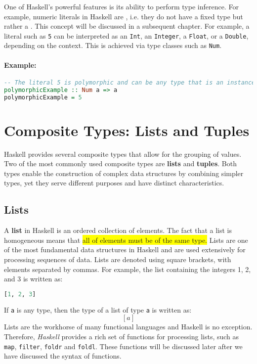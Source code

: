 \noindent
One of Haskell’s powerful features is its ability to perform type inference. For example, numeric literals in
Haskell are , i.e. they do not have a fixed type but rather a .  This
concept will be discussed in a subsequent chapter.  For example, a literal such as \texttt{5} can be
interpreted as an \texttt{Int}, an \texttt{Integer}, a \texttt{Float}, or a \texttt{Double}, depending on the
context. This is achieved via type classes such as \texttt{Num}. 

\paragraph{Example:}
\begin{lstlisting}[style=haskellstyle, language=Haskell]
-- The literal 5 is polymorphic and can be any type that is an instance of Num.
polymorphicExample :: Num a => a
polymorphicExample = 5
\end{lstlisting}

\section{Composite Types: Lists and Tuples}

Haskell provides several composite types that allow for the grouping of values. Two of the most commonly used
composite types are \textbf{lists} and \textbf{tuples}. Both types enable the construction of complex data
structures by combining simpler types, yet they serve different purposes and have distinct characteristics. 

\subsection{Lists}
A \textbf{list} in Haskell is an  ordered collection of elements.  The fact that a list is
homogeneous means that \colorbox{yellow}{all of elements must be of the same type.} Lists are one of the most fundamental data structures in Haskell and are used extensively for
processing sequences of data. Lists are denoted using square brackets, with elements separated by commas. For
example, the list containing the integers 1, 2, and 3 is written as: 
\begin{lstlisting}[style=haskellstyle, language=Haskell]
[1, 2, 3]
\end{lstlisting}
If \texttt{a} is any type, then the type of a list of type \texttt{a} is written as:
\[
[ a ]
\]
Lists are the workhorse of many functional languages and Haskell is no exception.  Therefore, \textsl{Haskell}
provides a rich set of functions for processing lists, such as \texttt{map}, \texttt{filter}, 
\texttt{foldr} and \texttt{foldl}.  These functions will be discussed later after we have discussed the syntax
of functions.

